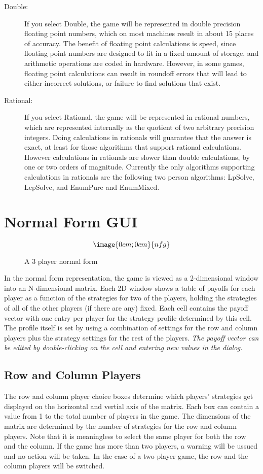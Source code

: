 \begin{description}
\item[Double:]  If you select Double, the game will be represented in double precision floating point numbers, which on most machines result in about 15 places of accuracy.  The benefit of floating point calculations is speed, since floating point numbers are designed to fit in a fixed amount of storage, and arithmetic operations are coded in hardware.  However,  in some games, floating point calculations can result in roundoff errors that will lead to either incorrect solutions, or failure to find solutions that exist.  

\item[Rational:]  If you select Rational, the game will be represented in rational numbers, which are represented internally as the quotient of two arbitrary precision integers.  Doing calculations in rationals will guarantee that the answer is exact, at least for those algorithms that support rational calculations.  However calculations in rationals are slower than double calculations, by one or two orders of magnitude.  Currently the only algorithms supporting calculations in rationals are the following two person algorithms: LpSolve, LcpSolve, and EnumPure and EnumMixed.  
\end{description}

\section{Normal Form GUI}

\begin{figure}
$$\image{0cm;0cm}{nfg}$$
\caption{A 3 player normal form}\label{fig:nfg}
\end{figure}

In the normal form representation, the game is viewed as a 2-dimensional
window into an N-dimensional matrix.  Each 2D window shows a table of
payoffs for each player as a function of the strategies for two of the
players, holding the strategies of all of the other players (if there are
any) fixed.  Each cell contains the payoff vector with one entry per
player for the strategy profile determined by this cell.  The profile
itself is set by using a combination of settings for the row and column
players plus the strategy settings for the rest of the players.  {\em The
payoff vector can be edited by double-clicking on the cell and entering
new values in the dialog.}

\subsection{Row and Column Players} The row and column player choice boxes
determine which players' strategies get displayed on the horizontal and
vertial axis of the matrix.  Each box can contain a value from 1 to the
total number of players in the game.  The dimensions of the matrix are
determined by the number of strategies for the row and column players.
Note that it is meaningless to select the same player for both the row and
the column.  If the game has more than two players, a warning will be
ussued and no action will be taken.  In the case of a two player game, the
row and the column players will be switched.

